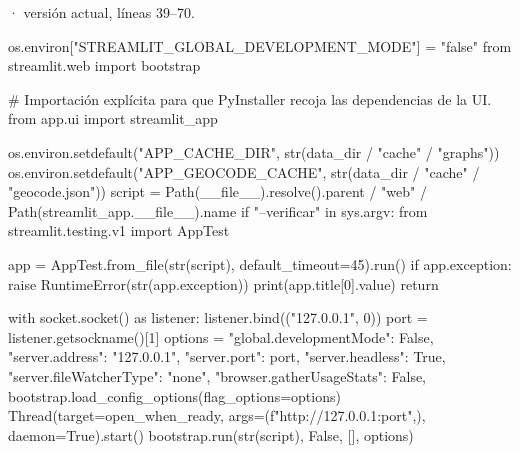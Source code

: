 \documentclass[11pt,a4paper]{article}
\begin{document}
\smallskip
{\footnotesize\texttt{} · versión actual, líneas 39--70.}\par
\begin{Codigo}[firstnumber=39]
    os.environ["STREAMLIT_GLOBAL_DEVELOPMENT_MODE"] = "false"
    from streamlit.web import bootstrap

    # Importación explícita para que PyInstaller recoja las dependencias de la UI.
    from app.ui import streamlit_app

    os.environ.setdefault("APP_CACHE_DIR", str(data_dir / "cache" / "graphs"))
    os.environ.setdefault("APP_GEOCODE_CACHE", str(data_dir / "cache" / "geocode.json"))
    script = Path(__file__).resolve().parent / "web" / Path(streamlit_app.__file__).name
    if "--verificar" in sys.argv:
        from streamlit.testing.v1 import AppTest

        app = AppTest.from_file(str(script), default_timeout=45).run()
        if app.exception:
            raise RuntimeError(str(app.exception))
        print(app.title[0].value)
        return

    with socket.socket() as listener:
        listener.bind(("127.0.0.1", 0))
        port = listener.getsockname()[1]
    options = {
        "global.developmentMode": False,
        "server.address": "127.0.0.1",
        "server.port": port,
        "server.headless": True,
        "server.fileWatcherType": "none",
        "browser.gatherUsageStats": False,
    }
    bootstrap.load_config_options(flag_options=options)
    Thread(target=open_when_ready, args=(f"http://127.0.0.1:{port}",), daemon=True).start()
    bootstrap.run(str(script), False, [], options)
\end{Codigo}
\end{document}
